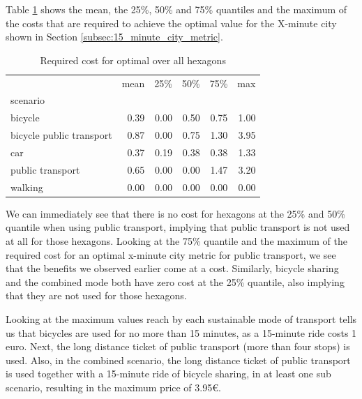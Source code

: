 Table \ref{tab:required_cost} shows the mean, the 25\%, 50\% and 75\% quantiles and the maximum of the costs that are required to achieve the optimal value for the X-minute city shown in Section \ref{subsec:15_minute_city_metric}.
\begin{table}
  \caption{Required cost for optimal over all hexagons}
  \label{tab:required_cost}
  \begin{center}
    \begin{tabular}{lrrrrr}
     & mean & 25\% & 50\% & 75\% & max \\
    scenario &  &  &  &  &  \\
    bicycle & 0.39 & 0.00 & 0.50 & 0.75 & 1.00 \\
    bicycle public transport & 0.87 & 0.00 & 0.75 & 1.30 & 3.95 \\
    car & 0.37 & 0.19 & 0.38 & 0.38 & 1.33 \\
    public transport & 0.65 & 0.00 & 0.00 & 1.47 & 3.20 \\
    walking & 0.00 & 0.00 & 0.00 & 0.00 & 0.00 \\
    \end{tabular}
  \end{center}
\end{table}
We can immediately see that there is no cost for hexagons at the 25\% and 50\% quantile when using public transport, implying that public transport is not used at all for those hexagons.
Looking at the 75\% quantile and the maximum of the required cost for an optimal x-minute city metric for public transport, we see that the benefits we observed earlier come at a cost.
Similarly, bicycle sharing and the combined mode both have zero cost at the 25\% quantile, also implying that they are not used for those hexagons.

Looking at the maximum values reach by each sustainable mode of transport tells us that bicycles are used for no more than 15 minutes, as a 15-minute ride costs 1 euro.
Next, the long distance ticket of public transport (more than four stops) is used.
Also, in the combined scenario, the long distance ticket of public transport is used together with a 15-minute ride of bicycle sharing, in at least one sub scenario, resulting in the maximum price of 3.95€.

